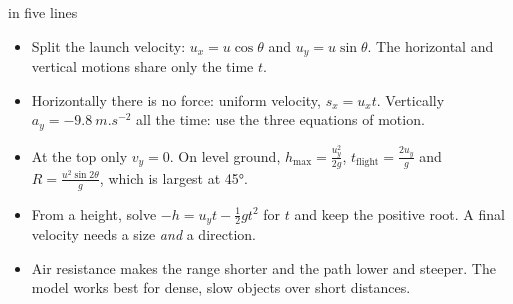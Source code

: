 \begin{summarybox}[unbreakable]{ in five lines}
\begin{itemize}
  \item Split the launch velocity: $u_x = u\cos\theta$ and $u_y = u\sin\theta$. The horizontal
        and vertical motions share only the time $t$.
  \item Horizontally there is no force: uniform velocity, $s_x = u_x t$. Vertically
        $a_y = \qty{-9.8}{m.s^{-2}}$ all the time: use the three equations of motion.
  \item At the top only $v_y = 0$. On level ground, $h_\mathrm{max} = \frac{u_y^2}{2g}$,
        $t_\mathrm{flight} = \frac{2u_y}{g}$ and $R = \frac{u^2\sin 2\theta}{g}$, which is largest
        at \ang{45}.
  \item From a height, solve $-h = u_y t - \tfrac{1}{2}gt^2$ for $t$ and keep the positive
        root. A final velocity needs a size \emph{and} a direction.
  \item Air resistance makes the range shorter and the path lower and steeper. The model works
        best for dense, slow objects over short distances.
\end{itemize}
\end{summarybox}
